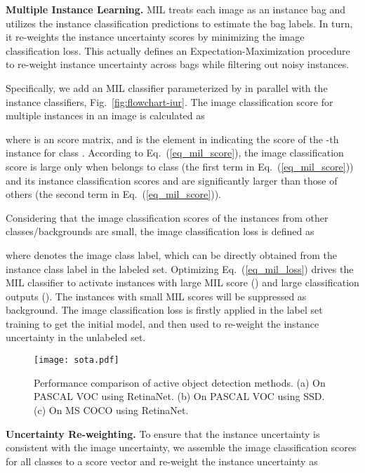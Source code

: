 \documentclass[final]{cvpr}
\begin{document}
\textbf{Multiple Instance Learning.} MIL treats each image as an instance bag and utilizes the instance classification predictions to estimate the bag labels. In turn, it re-weights the instance uncertainty scores by minimizing the image classification loss. This actually defines an Expectation-Maximization procedure~\cite{andrews2002MIL, Bilen2016Weakly} to re-weight instance uncertainty across bags while filtering out noisy instances. 

Specifically, we add an MIL classifier  parameterized by  in parallel with the instance classifiers, Fig.~\ref{fig:flowchart-iur}. The image classification score  for multiple instances in an image is calculated as

where  is an  score matrix, and  is the element in  indicating the score of the -th instance for class . According to Eq.~(\ref{eq_mil_score}), the image classification score  is large only when  belongs to class  (the first term in Eq.~(\ref{eq_mil_score})) and its instance classification scores  and  are significantly larger than those of others (the second term in Eq.~(\ref{eq_mil_score})). 

Considering that the image classification scores of the instances from other classes/backgrounds are small, the image classification loss  is defined as

where  denotes the image class label, which can be directly obtained from the instance class label  in the labeled set.
Optimizing Eq.~(\ref{eq_mil_loss}) drives the MIL classifier to activate instances with large MIL score () and large classification outputs (). 
The instances with small MIL scores will be suppressed as background. The image classification loss is firstly applied in the label set training to get the initial model, and then used to re-weight the instance uncertainty in the unlabeled set.

\begin{figure*}[ht!]
    \centering
\texttt{[image: sota.pdf]}
    \caption{Performance comparison of active object detection methods. (a) On PASCAL VOC using RetinaNet. (b) On PASCAL VOC using SSD. (c) On MS COCO using RetinaNet.}
    \label{fig:SOTA}
\end{figure*}

\textbf{Uncertainty Re-weighting.} To ensure that the instance uncertainty is consistent with the image uncertainty, we assemble the image classification scores for all classes to a score vector  and re-weight the instance uncertainty as
\end{document}
